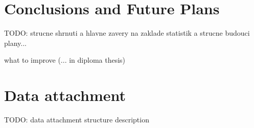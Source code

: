\documentclass[a4paper, 12pt, twoside]{fithesis2}		%
\renewcommand{\_}{\leavevmode \kern0.0em\vbox{\hrule width0.4em}}
\begin{document}
\chapter{Conclusions and Future Plans}
\label{chap:future}

TODO: strucne shrnuti a hlavne zavery na zaklade statistik a strucne budouci plany...


what to improve (... in diploma thesis)





\appendix


\printbibliography

\chapter{Data attachment}

TODO: data attachment structure description
\end{document}
